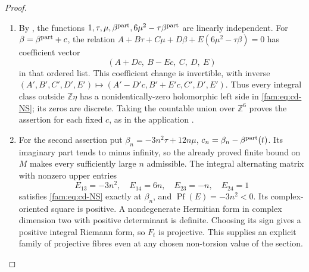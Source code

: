 \begin{proof}
\begin{enumerate}[label=\arabic*.,leftmargin=*]
\item By \cite[Lemma~9.3, p.~66]{AC2026}, the functions
$1,\tau,\mu,\beta^{\rm part},6\mu^2-\tau\beta^{\rm part}$ are linearly
independent. For $\beta=\beta^{\rm part}+c$, the relation
$A+B\tau+C\mu+D\beta+E(6\mu^2-\tau\beta)=0$ has coefficient vector
\[
 (A+Dc,\ B-Ec,\ C,\ D,\ E)
\]
in that ordered list. This coefficient change is invertible, with inverse
$(A',B',C',D',E')\mapsto(A'-D'c,B'+E'c,C',D',E')$.
Thus every integral class outside $\mathbb Z\eta$ has a
nonidentically-zero holomorphic left side in \eqref{fam:eq:cd-NS}; its
zeros are discrete. Taking the countable union over $\mathbb Z^6$ proves
the assertion for each fixed $c$, as in the application
\cite[Proposition~9.5, p.~67]{AC2026}.

\item For the second assertion put
\(\beta_n=-3n^2\tau+12n\mu\),
\(c_n=\beta_n-\beta^{\rm part}(t)\). Its imaginary part tends to
minus infinity, so the already proved finite bound on \(M\) makes every
sufficiently large \(n\) admissible. The integral alternating matrix
with nonzero upper entries
\[
 E_{13}=-3n^2,\quad E_{14}=6n,\quad E_{23}=-n,\quad E_{24}=1
\]
satisfies \eqref{fam:eq:cd-NS} exactly at \(\beta_n\), and
\(\operatorname{Pf}(E)=-3n^2<0\). Its complex-oriented square is positive.
A nondegenerate Hermitian form in complex dimension two with positive
determinant is definite. Choosing its sign gives a positive integral
Riemann form, so \(F_t\) is projective. This supplies an explicit family
of projective fibres even at any chosen non-torsion value of the section.
\end{enumerate}
\end{proof}

